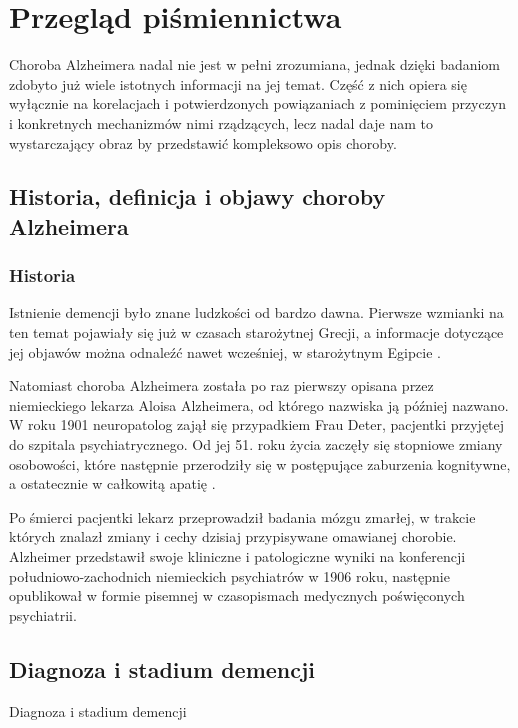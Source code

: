 \chapter{Przegląd piśmiennictwa}

Choroba Alzheimera nadal nie jest w pełni zrozumiana, jednak dzięki badaniom zdobyto już wiele istotnych informacji na jej temat.
Część z nich opiera się wyłącznie na korelacjach i potwierdzonych powiązaniach z pominięciem przyczyn i konkretnych mechanizmów nimi rządzących, lecz nadal daje nam to wystarczający obraz by przedstawić kompleksowo opis choroby.

\section{Historia, definicja i objawy choroby Alzheimera}

\subsection{Historia}

Istnienie demencji było znane ludzkości od bardzo dawna.
Pierwsze wzmianki na ten temat pojawiały się już w czasach starożytnej Grecji, a informacje dotyczące jej objawów można odnaleźć nawet wcześniej, w starożytnym Egipcie \cite{boller1998history}.

Natomiast choroba Alzheimera została po raz pierwszy opisana przez niemieckiego lekarza Aloisa Alzheimera, od którego nazwiska ją później nazwano.
W roku 1901 neuropatolog zajął się przypadkiem Frau Deter, pacjentki przyjętej do szpitala psychiatrycznego.
Od jej 51. roku życia zaczęły się stopniowe zmiany osobowości, które następnie przerodziły się w postępujące zaburzenia kognitywne, a ostatecznie w całkowitą apatię \cite{cipriani2011alzheimer}.

Po śmierci pacjentki lekarz przeprowadził badania mózgu zmarłej, w trakcie których znalazł zmiany i cechy dzisiaj przypisywane omawianej chorobie.
Alzheimer przedstawił swoje kliniczne i patologiczne wyniki na konferencji południowo-zachodnich niemieckich psychiatrów w 1906 roku, następnie opublikował w formie pisemnej w czasopismach medycznych poświęconych psychiatrii.

\section{Diagnoza i stadium demencji}

Diagnoza i stadium demencji

